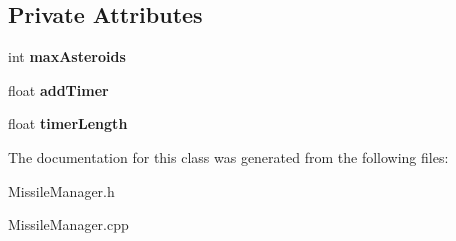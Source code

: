 \subsection*{Private Attributes}
\begin{DoxyCompactItemize}
\item 
int {\bfseries max\+Asteroids}\hypertarget{class_missile_manager_a435d791cd5825f4ea49bbe3ee8c45c60}{}\label{class_missile_manager_a435d791cd5825f4ea49bbe3ee8c45c60}

\item 
float {\bfseries add\+Timer}\hypertarget{class_missile_manager_a3b1a32ecdff310bc1dd0e8058a0d8aef}{}\label{class_missile_manager_a3b1a32ecdff310bc1dd0e8058a0d8aef}

\item 
float {\bfseries timer\+Length}\hypertarget{class_missile_manager_a7e19f2a049cc0cbf0682c2eb4ef7b43e}{}\label{class_missile_manager_a7e19f2a049cc0cbf0682c2eb4ef7b43e}

\end{DoxyCompactItemize}


The documentation for this class was generated from the following files\+:\begin{DoxyCompactItemize}
\item 
Missile\+Manager.\+h\item 
Missile\+Manager.\+cpp\end{DoxyCompactItemize}
